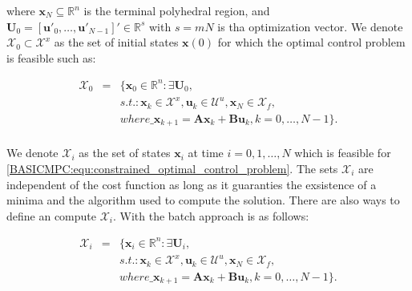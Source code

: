     where $\textbf{x}_N\subseteq\mathbb{R}^n$ is the terminal polyhedral region, and $\textbf{U}_0=[\textbf{u}'_0,\dots,\textbf{u}'_{N-1}]'\in\mathbb{R}^s$ with $s=mN$ is tha optimization vector. We denote $\mathcal{X}_0\subset\mathcal{X}^x$ as the set of initial states $\textbf{x}(0)$ for which the optimal control problem is feasible such as:

    \begin{equation}
        \begin{array}{rcl}
            \mathcal{X}_0&=&\{
            \textbf{x}_0\in\mathbb{R}^n:\exists\textbf{U}_0,\\
            &&s.t.:\textbf{x}_k\in\mathcal{X}^x,\textbf{u}_k\in\mathcal{U}^u,\textbf{x}_N\in\mathcal{X}_f,\\
            &&where\_ \textbf{x}_{k+1}=\textbf{Ax}_{k}+\textbf{Bu}_{k},k=0,\dots,N-1
            \}.\\
        \end{array}
        \label{BASICMPC:equ:constrained_initial_set}
    \end{equation}

    We denote $\mathcal{X}_i$ as the set of states $\textbf{x}_i$ at time $i=0,1,\dots,N$ which is feasible for \ref{BASICMPC:equ:constrained_optimal_control_problem}. The sets $\mathcal{X}_i$ are independent of the cost function as long as it guaranties the exsistence of a minima and the algorithm used to compute the solution. There are also ways to define an compute $\mathcal{X}_i$. With the batch approach is as follows:

    \begin{equation}
        \begin{array}{rcl}
            \mathcal{X}_i&=&\{
            \textbf{x}_i\in\mathbb{R}^n:\exists\textbf{U}_i,\\
            &&s.t.:\textbf{x}_k\in\mathcal{X}^x,\textbf{u}_k\in\mathcal{U}^u,\textbf{x}_N\in\mathcal{X}_f,\\
            &&where\_ \textbf{x}_{k+1}=\textbf{Ax}_{k}+\textbf{Bu}_{k},k=0,\dots,N-1
            \}.\\
        \end{array}
        \label{BASICMPC:equ:constrained_feasible_set}
    \end{equation}


